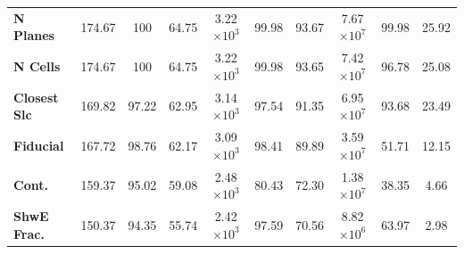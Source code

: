 \begin{table}[!hb]
\begin{tabular}{|l|ccc|ccc|ccc|}
\textbf{N Planes}      & 174.67            & 100                                                                & 64.75                                     & 3.22$\times 10^3$                                          & 99.98                                                               & 93.67                                      & 7.67$\times 10^7$          & 99.98                                                              & 25.92                                     \\
\textbf{N Cells}       & 174.67            & 100                                                                & 64.75                                     & 3.22$\times 10^3$                                           & 99.98                                                               & 93.65                                      & 7.42$\times 10^7$          & 96.78                                                              & 25.08                                     \\
\textbf{Closest Slc}  & 169.82            & 97.22                                                              & 62.95                                     & 3.14$\times 10^3$                                           & 97.54                                                               & 91.35                                      & 6.95$\times 10^7$          & 93.68                                                              & 23.49 \\
\textbf{Fiducial}     & 167.72            & 98.76                                                              & 62.17                                     & 3.09$\times 10^3$           & 98.41                                                               & 89.89                                      & 3.59$\times 10^7$          & 51.71                                                              & 12.15                                     \\
\textbf{Cont.}  & 159.37            & 95.02                                                              & 59.08                                     & 2.48$\times 10^3$           & 80.43                                                               & 72.30                                      & 1.38$\times 10^7$          & 38.35                                                              & 4.66                                      \\
\textbf{ShwE Frac.}  & 150.37            & 94.35                                                              & 55.74                                     & 2.42$\times 10^3$           & 97.59                                                               & 70.56                                      & 8.82$\times 10^6$          & 63.97                                                              & 2.98                                      \\

\end{tabular}
\end{table}
